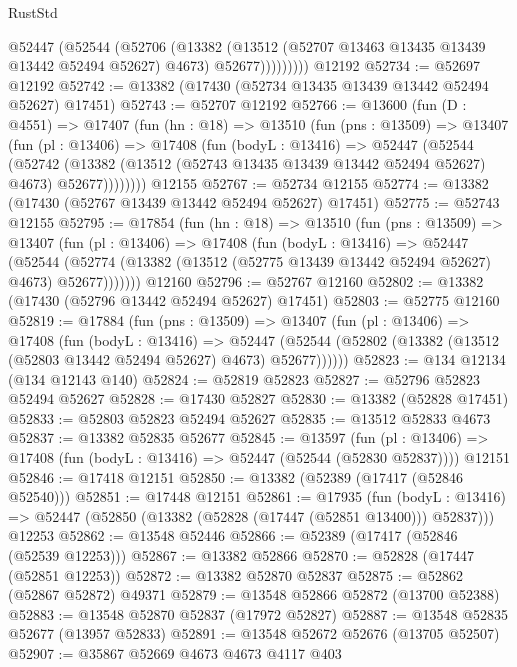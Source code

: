 \begin{lexlean}{RustStd}
\begin{coremodule}
              @52447
                (@52544
                  (@52706
                    (@13382
                      (@13512 (@52707 @13463 @13435 @13439 @13442 @52494 @52627) @4673)
                      @52677)))))))))
    @12192
@52734 := @52697 @12192
@52742 := @13382 (@17430 (@52734 @13435 @13439 @13442 @52494 @52627) @17451)
@52743 := @52707 @12192
@52766 := @13600
    (fun (D : @4551) =>
    @17407
      (fun (hn : @18) =>
      @13510
        (fun (pns : @13509) =>
        @13407
          (fun (pl : @13406) =>
          @17408
            (fun (bodyL : @13416) =>
            @52447
              (@52544
                (@52742
                  (@13382 (@13512 (@52743 @13435 @13439 @13442 @52494 @52627) @4673) @52677))))))))
    @12155
@52767 := @52734 @12155
@52774 := @13382 (@17430 (@52767 @13439 @13442 @52494 @52627) @17451)
@52775 := @52743 @12155
@52795 := @17854
    (fun (hn : @18) =>
    @13510
      (fun (pns : @13509) =>
      @13407
        (fun (pl : @13406) =>
        @17408
          (fun (bodyL : @13416) =>
          @52447
            (@52544
              (@52774 (@13382 (@13512 (@52775 @13439 @13442 @52494 @52627) @4673) @52677)))))))
    @12160
@52796 := @52767 @12160
@52802 := @13382 (@17430 (@52796 @13442 @52494 @52627) @17451)
@52803 := @52775 @12160
@52819 := @17884
    (fun (pns : @13509) =>
    @13407
      (fun (pl : @13406) =>
      @17408
        (fun (bodyL : @13416) =>
        @52447 (@52544 (@52802 (@13382 (@13512 (@52803 @13442 @52494 @52627) @4673) @52677))))))
@52823 := @134 @12134 (@134 @12143 @140)
@52824 := @52819 @52823
@52827 := @52796 @52823 @52494 @52627
@52828 := @17430 @52827
@52830 := @13382 (@52828 @17451)
@52833 := @52803 @52823 @52494 @52627
@52835 := @13512 @52833 @4673
@52837 := @13382 @52835 @52677
@52845 := @13597
    (fun (pl : @13406) => @17408 (fun (bodyL : @13416) => @52447 (@52544 (@52830 @52837))))
    @12151
@52846 := @17418 @12151
@52850 := @13382 (@52389 (@17417 (@52846 @52540)))
@52851 := @17448 @12151
@52861 := @17935
    (fun (bodyL : @13416) => @52447 (@52850 (@13382 (@52828 (@17447 (@52851 @13400))) @52837)))
    @12253
@52862 := @13548 @52446
@52866 := @52389 (@17417 (@52846 (@52539 @12253)))
@52867 := @13382 @52866
@52870 := @52828 (@17447 (@52851 @12253))
@52872 := @13382 @52870 @52837
@52875 := @52862 (@52867 @52872) @49371
@52879 := @13548 @52866 @52872 (@13700 @52388)
@52883 := @13548 @52870 @52837 (@17972 @52827)
@52887 := @13548 @52835 @52677 (@13957 @52833)
@52891 := @13548 @52672 @52676 (@13705 @52507)
@52907 := @35867
    @52669
    @4673
    @4673
    @4117
    @403

\end{coremodule}
\end{lexlean}
